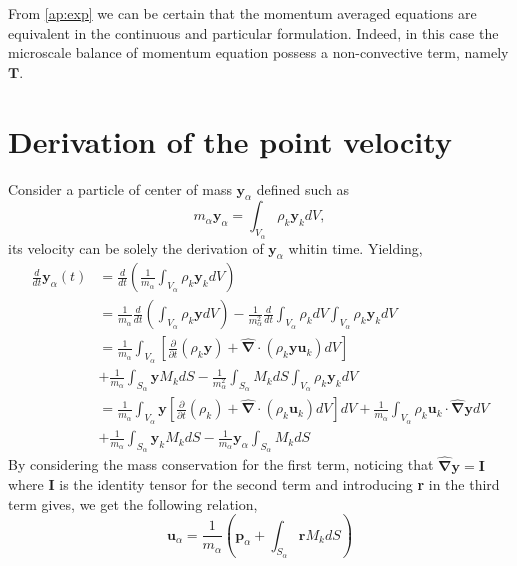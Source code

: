 \documentclass[twocolumn]{My_article}
\newcommand{\nablabh}{\hat{\bm{\nabla}}}
\newcommand{\ddt}{\frac{d}{d t}}
\newcommand{\pddt}{\frac{\partial}{\partial t}}
\begin{document}
From \ref{ap:exp} we can be certain that the momentum averaged equations are equivalent in the continuous and particular formulation.
Indeed, in this case the microscale balance of momentum equation possess a non-convective term, namely $\textbf{T}$.



\appendix
\onecolumn

\section{Derivation of the point velocity}

Consider a particle of center of mass $\textbf{y}_\alpha$ defined such as
\begin{equation*}
    m_\alpha \textbf{y}_\alpha
    = \int_{V_\alpha} \rho_k \textbf{y}_k dV,
\end{equation*}
its velocity can be solely the derivation of $\textbf{y}_\alpha$ whitin time.
Yielding, 
\begin{align*}
    \ddt \textbf{y}_\alpha (t)
    &=
    \ddt \left(
        \frac{1}{m_\alpha} \int_{V_\alpha} \rho_k \textbf{y}_k dV
    \right)\\
    &= \frac{1}{m_\alpha}
    \ddt 
    \left(
        \int_{V_\alpha} \rho_k \textbf{y} dV
    \right)
    - \frac{1}{m_\alpha^2} \ddt \int_{V_\alpha} \rho_k dV \int_{V_\alpha} \rho_k \textbf{y}_k dV
    \\
    &= \frac{1}{m_\alpha}\int_{V_\alpha} \left[
        \pddt (\rho_k \textbf{y}) + \nablabh \cdot\left(\rho_k \textbf{y}\textbf{u}_k\right) dV 
    \right]\\
    &+ \frac{1}{m_\alpha}\int_{S_\alpha} \textbf{y} M_k d S
    -  \frac{1}{m_\alpha^2} \int_{S_\alpha} M_k dS  \int_{V_\alpha} \rho_k \textbf{y}_k dV
    \\
    &= \frac{1}{m_\alpha}\int_{V_\alpha} \textbf{y} \left[
    \pddt (\rho_k) + \nablabh \cdot\left(\rho_k \textbf{u}_k\right) dV 
    \right]dV
    + \frac{1}{m_\alpha}\int_{V_\alpha} \rho_k  \textbf{u}_k  \cdot \nablabh \textbf{y} dV \\
    &+ \frac{1}{m_\alpha}\int_{S_\alpha} \textbf{y}_k M_k d S
    - \frac{1}{m_\alpha}  \textbf{y}_\alpha \int_{S_\alpha} M_k dS
\end{align*}
By considering the mass conservation for the first term,  noticing that $\nablabh \textbf{y} = \textbf{I}$ where $\textbf{I}$ is the identity tensor for the second term and introducing \textbf{r} in the third term gives, we get the following relation,
\begin{equation*}
    \textbf{u}_\alpha
    = \frac{1}{m_\alpha} \left(
        \textbf{p}_\alpha
        +  \int_{S_\alpha} \textbf{r} M_k dS
    \right)
\end{equation*}
\end{document}
